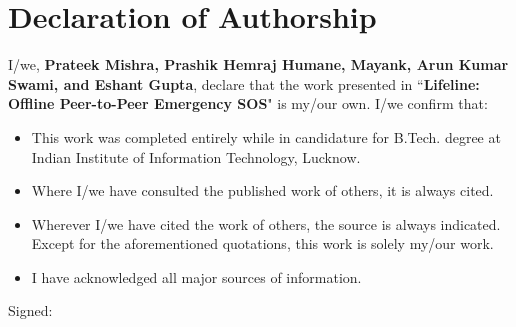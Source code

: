 \thispagestyle{empty}

\setcounter{page}{3}

\chapter*{Declaration of Authorship}

\vspace{1cm}

\noindent 
I/we, \textbf{Prateek Mishra, Prashik Hemraj Humane, Mayank, Arun Kumar Swami, and Eshant Gupta}, declare that the work presented in ``\textbf{Lifeline: Offline Peer-to-Peer Emergency SOS}" is my/our own. I/we confirm that:

\medskip

\begin{itemize} 
    \item This work was completed entirely while in candidature for B.Tech. degree at Indian Institute of Information Technology, Lucknow.
    
    \medskip
    
    \item Where I/we have consulted the published work of others, it is always cited.
    
    \medskip
    
    \item Wherever I/we have cited the work of others, the source is always indicated. Except for the aforementioned quotations, this work is solely my/our work.
    
    \medskip
    
    \item I have acknowledged all major sources of information.
\end{itemize}

\vspace{2cm}

\noindent Signed:\\

\vspace{0.5cm}

